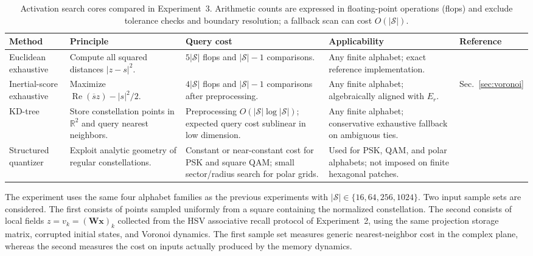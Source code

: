 \documentclass[10pt,journal,letterpaper]{IEEEtran}
\begin{document}
\begin{table}[!t]
\centering
\caption{Activation search cores compared in Experiment~3. Arithmetic counts are
expressed in floating-point operations (flops) and exclude tolerance checks
and boundary resolution; a fallback scan can cost $O(|\mathcal{S}|)$.}
\label{tab:exp3_methods}
\scriptsize
\setlength{\tabcolsep}{3.0pt}
\renewcommand{\arraystretch}{1.12}
\begin{tabular}{>{\raggedright\arraybackslash}p{}>{\raggedright\arraybackslash}p{}>{\raggedright\arraybackslash}p{}>{\raggedright\arraybackslash}p{}>{\raggedright\arraybackslash}p{}}
\toprule
Method & Principle & Query cost & Applicability & Reference \\
\midrule
Euclidean exhaustive &
Compute all squared distances $|z-s|^2$. &
$5|\mathcal{S}|$ flops and $|\mathcal{S}|-1$ comparisons. &
Any finite alphabet; exact reference implementation. &
\cite{aurenhammer2013voronoi} \\
Inertial-score exhaustive &
Maximize $\operatorname{Re}(\overline{s}z)-|s|^2/2$. &
$4|\mathcal{S}|$ flops and $|\mathcal{S}|-1$ comparisons after preprocessing. &
Any finite alphabet; algebraically aligned with $E_r$. &
Sec.~\ref{sec:voronoi} \\
KD-tree &
Store constellation points in $\mathbb{R}^2$ and query nearest neighbors. &
Preprocessing $O(|\mathcal{S}|\log|\mathcal{S}|)$; expected query cost sublinear in low dimension. &
Any finite alphabet; conservative exhaustive fallback on ambiguous ties. &
\cite{bentley1975,friedman1977} \\
Structured quantizer &
Exploit analytic geometry of regular constellations. &
Constant or near-constant cost for PSK and square QAM; small sector/radius search for polar grids. &
Used for PSK, QAM, and polar alphabets; not imposed on finite hexagonal patches. &
\cite{proakis2008} \\
\bottomrule
\end{tabular}
\end{table}

The experiment uses the same four alphabet families as the previous
experiments with
$|\mathcal{S}|\in\{16,64,256,1024\}$. Two input sample sets are considered. The
first consists of points sampled uniformly from a square containing the
normalized constellation. The second consists of local fields
$z=v_k=(\boldsymbol{W}\boldsymbol{x})_k$ collected from the HSV associative
recall protocol of Experiment~2, using the same projection storage matrix,
corrupted initial states, and Voronoi dynamics. The first sample set measures
generic nearest-neighbor cost in the complex plane, whereas the second measures
the cost on inputs actually produced by the memory dynamics.
\end{document}
